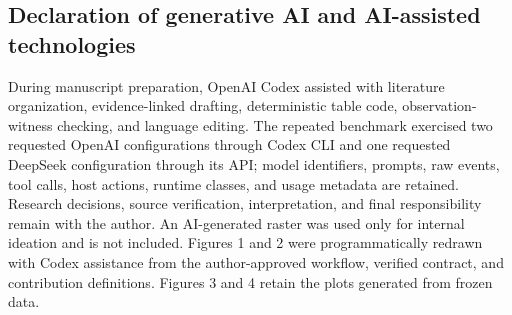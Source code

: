\subsection*{Declaration of generative AI and AI-assisted technologies}

During manuscript preparation, OpenAI Codex assisted with literature organization, evidence-linked drafting, deterministic table code, observation-witness checking, and language editing. The repeated benchmark exercised two requested OpenAI configurations through Codex CLI and one requested DeepSeek configuration through its API; model identifiers, prompts, raw events, tool calls, host actions, runtime classes, and usage metadata are retained. Research decisions, source verification, interpretation, and final responsibility remain with the author. An AI-generated raster was used only for internal ideation and is not included. Figures 1 and 2 were programmatically redrawn with Codex assistance from the author-approved workflow, verified contract, and contribution definitions. Figures 3 and 4 retain the plots generated from frozen data.
